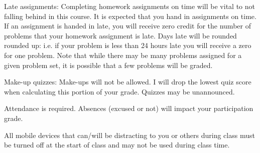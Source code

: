 \documentclass[10pt]{article}
\begin{document}
Late assignments: Completing homework assignments on time will be vital to not falling behind in this course. It is expected that you hand in assignments on time. If an assignment is handed in late, you will receive zero credit for the number of problems that your homework assignment is late. Days late will be rounded rounded up: i.e. if your problem is less than 24 hours late you will receive a zero for one problem. Note that while there may be many problems assigned for a given problem set, it is possible that a few problems will be graded.  

Make-up quizzes: Make-ups will not be allowed. I will drop the lowest quiz score when calculating this portion of your grade. Quizzes may be unannounced.

Attendance is required. Absences (excused or not) will impact your participation grade.

All mobile devices that can/will be distracting to you or others during class must be turned off at the start of class and may not be used during class time.
  
\end{document}
